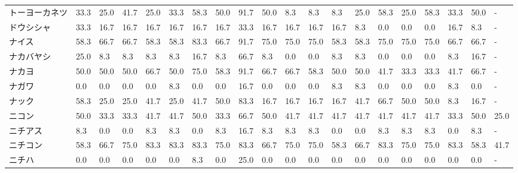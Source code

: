 \documentclass[a4paper，11pt]{jsarticle}
\begin{document}
\begin{longtable}[c]{lp{3mm}p{3mm}p{3mm}p{3mm}p{3mm}p{3mm}p{3mm}p{3mm}p{3mm}p{3mm}p{3mm}p{3mm}p{3mm}p{3mm}p{3mm}p{3mm}p{3mm}p{3mm}p{3mm}}
トーヨーカネツ         &   33.3 &   25.0 &      41.7 &      25.0 &       33.3 &   58.3 &   50.0 &   91.7 &    50.0 &     8.3 &    8.3 &   8.3 &   25.0 &    58.3 &    25.0 &  58.3 &  33.3 &  50.0 &     - \\
ドウシシャ           &   33.3 &   16.7 &      16.7 &      16.7 &       16.7 &   16.7 &   16.7 &   33.3 &    16.7 &    16.7 &   16.7 &  16.7 &    8.3 &     0.0 &     0.0 &   0.0 &  16.7 &   8.3 &     - \\
ナイス             &   58.3 &   66.7 &      66.7 &      58.3 &       58.3 &   83.3 &   66.7 &   91.7 &    75.0 &    75.0 &   75.0 &  58.3 &   58.3 &    75.0 &    75.0 &  75.0 &  66.7 &  66.7 &     - \\
ナカバヤシ           &   25.0 &    8.3 &       8.3 &       8.3 &        8.3 &   16.7 &    8.3 &   66.7 &     8.3 &     0.0 &    0.0 &   8.3 &    8.3 &     0.0 &     0.0 &   0.0 &   8.3 &  16.7 &     - \\
ナカヨ             &   50.0 &   50.0 &      50.0 &      66.7 &       50.0 &   75.0 &   58.3 &   91.7 &    66.7 &    66.7 &   58.3 &  50.0 &   50.0 &    41.7 &    33.3 &  33.3 &  41.7 &  66.7 &     - \\
ナガワ             &    0.0 &    0.0 &       0.0 &       0.0 &        8.3 &    0.0 &    0.0 &   16.7 &     0.0 &     0.0 &    0.0 &   8.3 &    8.3 &     0.0 &     0.0 &   0.0 &   8.3 &   0.0 &     - \\
ナック             &   58.3 &   25.0 &      25.0 &      41.7 &       25.0 &   41.7 &   50.0 &   83.3 &    16.7 &    16.7 &   16.7 &  16.7 &   41.7 &    66.7 &    50.0 &  50.0 &   8.3 &  16.7 &     - \\
ニコン             &   50.0 &   33.3 &      33.3 &      41.7 &       41.7 &   50.0 &   33.3 &   66.7 &    50.0 &    41.7 &   41.7 &  41.7 &   41.7 &    41.7 &    41.7 &  41.7 &  33.3 &  50.0 &  25.0 \\
ニチアス            &    8.3 &    0.0 &       0.0 &       8.3 &        8.3 &    0.0 &    8.3 &   16.7 &     8.3 &     8.3 &    8.3 &   0.0 &    0.0 &     8.3 &     8.3 &   8.3 &   0.0 &   8.3 &     - \\
ニチコン            &   58.3 &   66.7 &      75.0 &      83.3 &       83.3 &   83.3 &   75.0 &   83.3 &    66.7 &    75.0 &   75.0 &  58.3 &   66.7 &    83.3 &    75.0 &  75.0 &  83.3 &  58.3 &  41.7 \\
ニチハ             &    0.0 &    0.0 &       0.0 &       0.0 &        0.0 &    8.3 &    0.0 &   25.0 &     0.0 &     0.0 &    0.0 &   0.0 &    0.0 &     0.0 &     0.0 &   0.0 &   0.0 &   0.0 &     - \\

\end{longtable}
\end{document}
